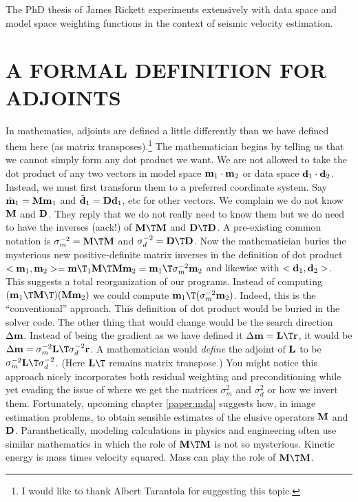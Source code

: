 \par
The PhD thesis of James Rickett experiments extensively
with data space and model space weighting functions
in the context of seismic velocity estimation.


\section{A FORMAL DEFINITION FOR ADJOINTS}

In mathematics, adjoints are defined a little differently than
we have defined them here
(as matrix transposes).\footnote{
	I would like to thank Albert Tarantola for suggesting this topic.
	}
The mathematician begins by telling us that we cannot simply
form any dot product we want.
We are not allowed to take the dot product of any two vectors
in model space
$\bold m_1 \cdot \bold m_2$ or data space
$\bold d_1 \cdot \bold d_2$.
Instead, we must first transform them to a preferred coordinate system.
Say
$\tilde{\bold m}_1 = \bold M \bold m_1$ and
$\tilde{\bold d}_1 = \bold D \bold d_1$, etc for other vectors.
We complain we do not know $\bold M$ and $\bold D$.
They reply that we do not really need to know them
but we do need to have the inverses (aack!) of
$\bold M\T\bold M$ and
$\bold D\T\bold D$.
A pre-existing common notation is
$\bold\sigma_m^{-2} = \bold M\T\bold M$ and
$\bold\sigma_d^{-2} = \bold D\T\bold D$.
Now the mathematician buries the mysterious new positive-definite
matrix inverses in the definition of dot product
$<\bold m_1,\bold m_2> = \bold m\T_1 \bold M\T\bold M \bold m_2 = \bold m_1\T \bold \sigma_m^{-2} \bold m_2$
and likewise with
$<\bold d_1,\bold d_2>$.
This suggests a total reorganization of our programs.
Instead of computing
$(\bold m_1\T \bold M\T) (\bold M \bold m_2)$
we could compute $\bold m_1\T (\bold\sigma_m^{-2} \bold m_2)$.
Indeed, this is the ``conventional'' approach.
This definition of dot product would be buried in the solver code.
The other thing that would change would be the search direction
$\Delta \bold m$.
Instead of being the gradient as we have defined it
$\Delta \bold m=\bold L\T\bold r$,
it would be
$\Delta \bold m=\bold\sigma_m^{-2} \bold L\T\bold\sigma_d^{-2}\bold r$.
A mathematician would
{\em define} the adjoint of $\bold L$ to be
$\bold\sigma_m^{-2} \bold L\T\bold\sigma_d^{-2}$.
(Here $\bold L\T$ remains matrix transpose.)
You might notice this approach nicely incorporates
both residual weighting and preconditioning
while yet evading the issue of where we get the matrices
$\sigma_m^2$ and $\sigma_d^2$ or how we invert them.
Fortunately, upcoming chapter \ref{paper:mda}
suggests how,
in image estimation problems,
to obtain sensible estimates of the elusive operators $\bold M$ and $\bold D$.
Paranthetically, modeling calculations in physics and engineering
often use similar mathematics
in which the role of $\bold M\T\bold M$ is not so mysterious.
Kinetic energy is mass times velocity squared.
Mass can play the role of $\bold M\T\bold M$.

